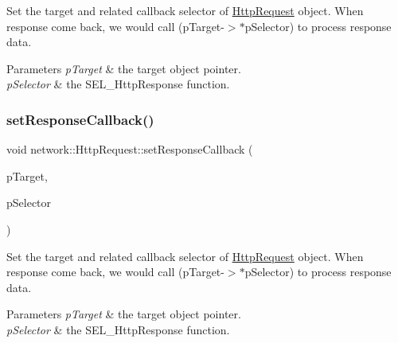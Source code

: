 Set the target and related callback selector of \hyperlink{classnetwork_1_1HttpRequest}{Http\+Request} object. When response come back, we would call (p\+Target-\/$>$$\ast$p\+Selector) to process response data.


\begin{DoxyParams}{Parameters}
{\em p\+Target} & the target object pointer. \\
\hline
{\em p\+Selector} & the S\+E\+L\+\_\+\+Http\+Response function. \\
\hline
\end{DoxyParams}
\mbox{\label{classnetwork_1_1HttpRequest_a58c485555dd39dfdcbc641cfb6d3fb9a}} 
\subsubsection{\texorpdfstring{set\+Response\+Callback()}{setResponseCallback()}\hspace{0.1cm}{\footnotesize\ttfamily [4/6]}}
{\footnotesize\ttfamily void network\+::\+Http\+Request\+::set\+Response\+Callback (\begin{DoxyParamCaption}\item[{\hyperlink{classRef}{Ref} $\ast$}]{p\+Target,  }\item[{S\+E\+L\+\_\+\+Http\+Response}]{p\+Selector }\end{DoxyParamCaption})\hspace{0.3cm}{\ttfamily [inline]}}

Set the target and related callback selector of \hyperlink{classnetwork_1_1HttpRequest}{Http\+Request} object. When response come back, we would call (p\+Target-\/$>$$\ast$p\+Selector) to process response data.


\begin{DoxyParams}{Parameters}
{\em p\+Target} & the target object pointer. \\
\hline
{\em p\+Selector} & the S\+E\+L\+\_\+\+Http\+Response function. \\
\hline
\end{DoxyParams}
\mbox{\label{classnetwork_1_1HttpRequest_adc68acc891305b3066f10f4763e03748}} 
